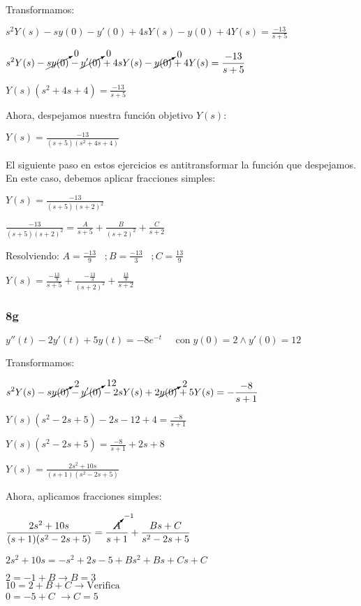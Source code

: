 \documentclass[11pt]{article}
\begin{document}
	Transformamos:
	
	$\displaystyle s^2Y(s)-sy(0)-y'(0)+4sY(s)-y(0)+4Y(s)=\frac{-13}{s+5}$
	
	$\displaystyle s^2Y(s)-\cancelto{0}{sy(0)}-\cancelto{0}{y'(0)}+4sY(s)-\cancelto{0}{y(0)}+4Y(s)=\frac{-13}{s+5}$
	
	$\displaystyle Y(s)\left(s^2+4s+4\right)=\frac{-13}{s+5}$
	
	Ahora, despejamos nuestra función objetivo $Y(s)$:
	
	$\displaystyle Y(s)=\frac{-13}{(s+5)(s^2+4s+4)}$
	
	El siguiente paso en estos ejercicios es antitransformar la función que despejamos. En este caso, debemos aplicar fracciones simples:
	
	$\displaystyle Y(s)=\frac{-13}{(s+5)(s+2)^{2}}$
	
	$\displaystyle \frac{-13}{(s+5)(s+2)^2}=\frac{A}{s+5}+\frac{B}{(s+2)^2}+\frac{C}{s+2}$
	
	Resolviendo: $\displaystyle A=\frac{-13}{9}\;\;\;;B=\frac{-13}{3}\;\;\;;C=\frac{13}{9}\;\;\;$
	
	$\displaystyle Y(s)=\frac{-\frac{13}{9}}{s+5}+\frac{-\frac{13}{3}}{(s+2)^2}+\frac{\frac{13}{9}}{s+2}$
	
	
	\subsubsection{8g}
	$y''(t)-2y'(t)+5y(t)=-8e^{-t} \;\;\;\;\; \mathrm{con} \; y(0)=2 \wedge y'(0)=12$
	
	Transformamos:
		
	$\displaystyle s^2Y(s)-s\cancelto{2}{y(0)}-\cancelto{12}{y'(0)}-2sY(s)+2\cancelto{2}{y(0)}+5Y(s)=-\frac{-8}{s+1}$
	
	$\displaystyle Y(s)(s^2-2s+5)-2s-12+4=\frac{-8}{s+1}$
	
	$\displaystyle Y(s)(s^2-2s+5)=\frac{-8}{s+1}+2s+8$
	
	$\displaystyle Y(s)=\frac{2s^2+10s}{(s+1)(s^2-2s+5)}$
	
	Ahora, aplicamos fracciones simples:
	
	$\displaystyle \frac{2s^2+10s}{(s+1)(s^2-2s+5)}=\frac{\cancelto{-1}{A}}{s+1}+\frac{Bs+C}{s^2-2s+5}$
	
	$\displaystyle 2s^2+10s=-s^2+2s-5+Bs^2+Bs+Cs+C$
	
	$\displaystyle 2=-1+B \rightarrow \boxed{B=3}$ \\
	$\displaystyle 10=2+B+C \rightarrow \mathrm{Verifica}$ \\
	$\displaystyle 0=-5+C$ $\rightarrow \boxed{C=5}$
	
\end{document}
